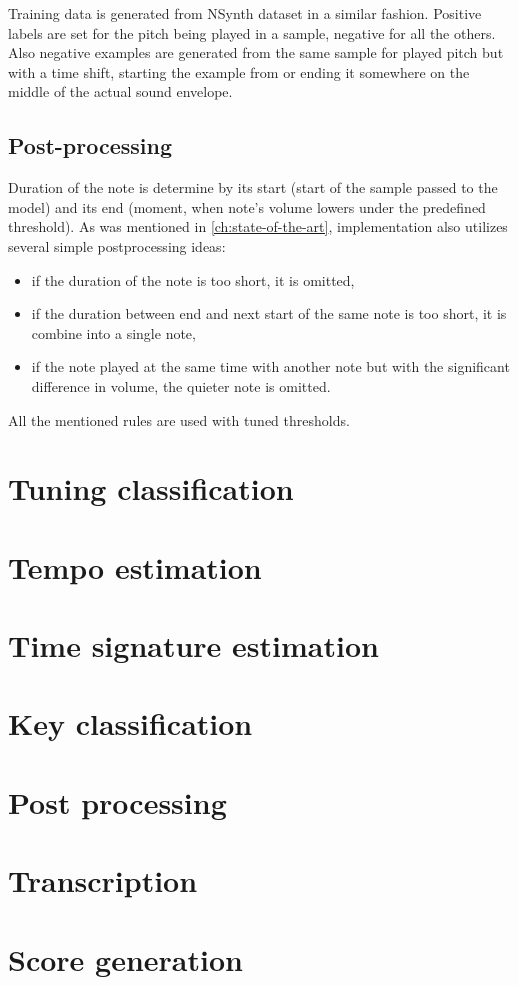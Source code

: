 Training data is generated from NSynth dataset in a similar fashion. Positive labels are set for the pitch being played
in a sample, negative for all the others. Also negative examples are generated from the same sample for played pitch but
with a time shift, starting the example from or ending it somewhere on the middle of the actual sound envelope.

\subsection{Post-processing}\label{subsec:post-processing}
Duration of the note is determine by its start (start of the sample passed to the model) and its end (moment, when
note's volume lowers under the predefined threshold). As was mentioned in \cref{ch:state-of-the-art}, implementation
also utilizes several simple postprocessing ideas:
\begin{itemize}
	\item if the duration of the note is too short, it is omitted,
	\item if the duration between end and next start of the same note is too short, it is combine into a single note,
	\item if the note played at the same time with another note but with the significant difference in volume,
	the quieter note is omitted.
\end{itemize}

All the mentioned rules are used with tuned thresholds.

\section{Tuning classification}\label{sec:tunning-classification}

\section{Tempo estimation}\label{sec:tempo-estimation}

\section{Time signature estimation}\label{sec:time-signature-estimation}

\section{Key classification}\label{sec:key-classification}

\section{Post processing}\label{sec:post-processing}

\section{Transcription}\label{sec:transcription}

\section{Score generation}\label{sec:score-generation}



